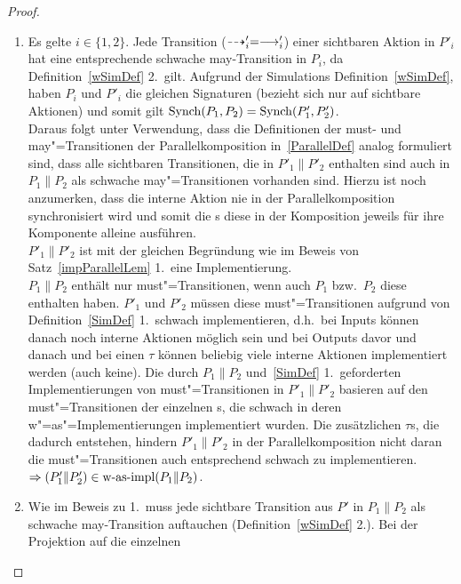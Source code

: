 \begin{proof}\mbox{}
  \begin{enumerate}
    \item Es gelte $i\in\{1,2\}$. Jede Transition ($\may '_i =\must '_i$) einer
      sichtbaren Aktion in $P'_i$ hat eine entsprechende schwache
      may-Transition in $P_i$, da Definition~\ref{wSimDef} 2.\ gilt. Aufgrund
      der Simulations Definition~\ref{wSimDef}, haben $P_i$ und $P'_i$ die
      gleichen Signaturen (bezieht sich nur auf sichtbare Aktionen) und somit
      gilt $\mathrm{Synch} (P_1,P_2) = \mathrm{Synch} (P'_1,P'_2)$.\\
      Daraus folgt unter Verwendung, dass die Definitionen der must- und
      may"=Transitionen der Parallelkomposition in~\ref{ParallelDef} analog
      formuliert sind, dass alle sichtbaren Transitionen, die in $P'_1\|P'_2$
      enthalten sind auch in $P_1\|P_2$ als schwache may"=Transitionen
      vorhanden sind. Hierzu ist noch anzumerken, dass die interne Aktion nie
      in der Parallelkomposition synchronisiert wird und somit die \MEIO{}s
      diese in der Komposition jeweils für ihre Komponente alleine ausführen.\\
      $P'_1\|P'_2$ ist mit der gleichen Begründung wie im Beweis von
      Satz~\ref{impParallelLem} 1.\ eine Implementierung.\\
      $P_1\|P_2$ enthält nur must"=Transitionen, wenn auch $P_1$ bzw.\ $P_2$
      diese enthalten haben. $P'_1$ und $P'_2$ müssen diese must"=Transitionen
      aufgrund von Definition~\ref{SimDef} 1.\ schwach implementieren, d.h.\
      bei Inputs können danach noch interne Aktionen möglich sein und bei
      Outputs davor und danach und bei einen $\tau$ können beliebig viele
      interne Aktionen implementiert werden (auch keine). Die durch $P_1\|P_2$
      und~\ref{SimDef} 1.\ geforderten Implementierungen von must"=Transitionen
      in $P'_1\|P'_2$ basieren auf den must"=Transitionen der einzelnen
      \MEIO{}s, die schwach in deren w"=as"=Implementierungen implementiert
      wurden. Die zusätzlichen $\tau$s, die dadurch entstehen, hindern
      $P'_1\|P'_2$ in der Parallelkomposition nicht daran die
      must"=Transitionen auch entsprechend schwach zu implementieren.\\
      $\Rightarrow (P'_1\|P'_2)\in\mathrm{w}\text{-}\mathrm{as}\text{-}\mathrm{impl} (P_1\|P_2)$.
    \item Wie im Beweis zu 1.\ muss jede sichtbare Transition aus $P'$ in
      $P_1\|P_2$ als schwache may-Transition auftauchen
      (Definition~\ref{wSimDef} 2.). Bei der Projektion auf die einzelnen

\end{enumerate}
\end{proof}

